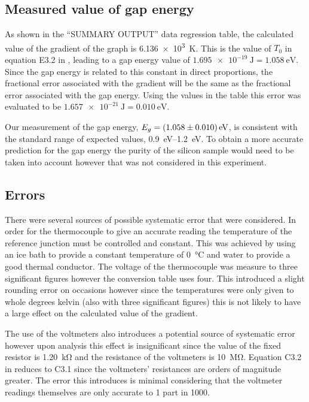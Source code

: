\documentclass[12pt]{article}
\begin{document}
\subsection{Measured value of gap energy}
As shown in the ``SUMMARY OUTPUT'' data regression table, the calculated value of the gradient of the graph is \SI{6.136e3}{\kelvin}. This is the value of $ T_0 $ in equation E3.2 in \cite{labmanual}, leading to a gap energy value of $ \SI{1.695e-19}{\joule} = \SI{1.058}{\electronvolt} $. Since the gap energy is related to this constant in direct proportions, the fractional error associated with the gradient will be the same as the fractional error associated with the gap energy. Using the values in the table this error was evaluated to be $ \SI{1.657e-21}{\joule} = \SI{0.010}{\electronvolt} $.

Our measurement of the gap energy, $ E_g = \SI{1.058 \pm 0.010}{\electronvolt} $, is consistent with the standard range of expected values, \SIrange{0.9}{1.2}{\electronvolt}. To obtain a more accurate prediction for the gap energy the purity of the silicon sample would need to be taken into account however that was not considered in this experiment.

\subsection{Errors}
There were several sources of possible systematic error that were considered. In order for the thermocouple to give an accurate reading the temperature of the reference junction must be controlled and constant. This was achieved by using an ice bath to provide a constant temperature of \SI{0}{\celsius} and water to provide a good thermal conductor. The voltage of the thermocouple was measure to three significant figures however the conversion table \cite{kayelaby} uses four. This introduced a slight rounding error on occasions however since the temperatures were only given to whole degrees kelvin (also with three significant figures) this is not likely to have a large effect on the calculated value of the gradient.

The use of the voltmeters also introduces a potential source of systematic error however upon analysis this effect is insignificant since the value of the fixed resistor is \SI{1.20}{\kilo\ohm} and the resistance of the voltmeters is \SI{10}{\mega\ohm}. Equation C3.2 in \cite{labmanual} reduces to C3.1 since the voltmeters' resistances are orders of magnitude greater. The error this introduces is minimal considering that the voltmeter readings themselves are only accurate to 1 part in 1000.
\end{document}
